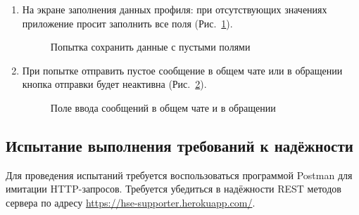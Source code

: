 \documentclass{../includes/TechDoc}
\begin{document}
\begin{enumerate}
        \item На экране заполнения данных профиля: при отсутствующих значениях приложение просит заполнить все поля (Рис.~\ref{fig:wait_page_empty_labels}).
        \begin{figure}[ht]
            \centering
            \caption{Попытка сохранить данные с пустыми полями}
            \label{fig:wait_page_empty_labels}
        \end{figure}

        \item При попытке отправить пустое сообщение в общем чате или в обращении кнопка отправки будет неактивна (Рис.~\ref{fig:input_text}).
        \begin{figure}[ht]
            \centering
            \caption{Поле ввода сообщений в общем чате и в обращении}
            \label{fig:input_text}
        \end{figure}
    \end{enumerate}

    \subsection{Испытание выполнения требований к надёжности}

    Для проведения испытаний требуется воспользоваться программой Postman для имитации HTTP-запросов.
    Требуется убедиться в надёжности REST методов сервера по адресу \url{https://hse-supporter.herokuapp.com/}.
\end{document}
